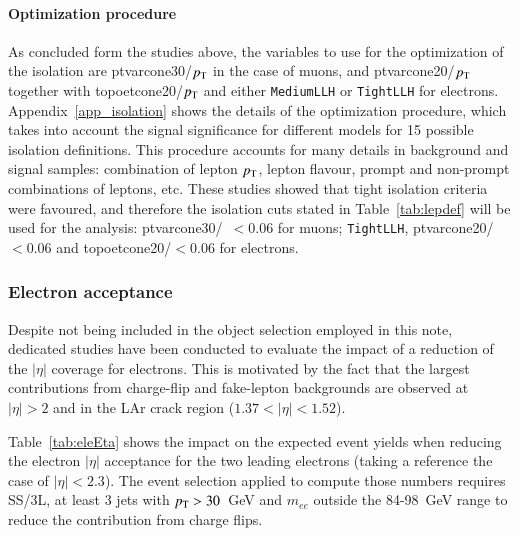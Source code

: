 \paragraph{Optimization procedure} As concluded form the studies above, the variables to use for the optimization of the isolation are ptvarcone30/$p_{\mathrm{T}}$ in the case of muons, and ptvarcone20/$p_{\mathrm{T}}$ together with topoetcone20/$p_{\mathrm{T}}$ and either {\tt MediumLLH} or 
{\tt TightLLH} for electrons. Appendix~\ref{app_isolation} shows the details of the optimization procedure, which takes into 
account the signal significance for different models for 15 possible isolation definitions. 
This procedure accounts for many details in background and signal samples: combination of lepton $p_{\mathrm{T}}$, 
lepton flavour, prompt and non-prompt combinations of leptons, etc. These studies showed that tight isolation criteria were favoured, 
and therefore the isolation cuts stated in Table~\ref{tab:lepdef} will be used for the analysis: ptvarcone30/\pt\ $<0.06$ for muons; {\tt TightLLH}, ptvarcone20/\pt$<$0.06 and topoetcone20/\pt$<$0.06 for electrons.


\subsubsection{Electron acceptance}
\label{sec:eleAcceptance}

Despite not being included in the object selection employed in this note, dedicated studies have been conducted to evaluate 
the impact of a reduction of the $|\eta|$ coverage for electrons. This is motivated by the fact that the largest contributions 
from charge-flip and fake-lepton backgrounds are observed at $|\eta|>2$ and in the LAr crack region ($1.37<|\eta|<1.52$).

Table~\ref{tab:eleEta} shows the impact on the expected event yields when reducing the electron $|\eta|$ acceptance 
for the two leading electrons (taking a reference the case of $|\eta|<2.3$). The event selection applied to compute those numbers 
requires SS/3L, at least 3 jets with $p_{\mathrm{T}} > 30$~GeV and $m_{ee}$ outside the 84-98~GeV range to reduce the contribution 
from charge flips. 

